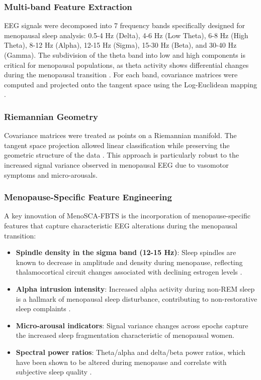 \documentclass[a4paper,fleqn]{cas-dc}
\begin{document}
\subsubsection{Multi-band Feature Extraction}
EEG signals were decomposed into 7 frequency bands specifically designed for menopausal sleep analysis: 0.5-4 Hz (Delta), 4-6 Hz (Low Theta), 6-8 Hz (High Theta), 8-12 Hz (Alpha), 12-15 Hz (Sigma), 15-30 Hz (Beta), and 30-40 Hz (Gamma). The subdivision of the theta band into low and high components is critical for menopausal populations, as theta activity shows differential changes during the menopausal transition \cite{Baker2023}. For each band, covariance matrices were computed and projected onto the tangent space using the Log-Euclidean mapping \cite{Barachant2012}.

\subsubsection{Riemannian Geometry}
Covariance matrices were treated as points on a Riemannian manifold. The tangent space projection allowed linear classification while preserving the geometric structure of the data \cite{Congedo2017}. This approach is particularly robust to the increased signal variance observed in menopausal EEG due to vasomotor symptoms and micro-arousals.

\subsubsection{Menopause-Specific Feature Engineering}
A key innovation of MenoSCA-FBTS is the incorporation of menopause-specific features that capture characteristic EEG alterations during the menopausal transition:

\begin{itemize}
\item \textbf{Spindle density in the sigma band (12-15 Hz)}: Sleep spindles are known to decrease in amplitude and density during menopause, reflecting thalamocortical circuit changes associated with declining estrogen levels \cite{Manber2003}.
\item \textbf{Alpha intrusion intensity}: Increased alpha activity during non-REM sleep is a hallmark of menopausal sleep disturbance, contributing to non-restorative sleep complaints \cite{Baker2023}.
\item \textbf{Micro-arousal indicators}: Signal variance changes across epochs capture the increased sleep fragmentation characteristic of menopausal women.
\item \textbf{Spectral power ratios}: Theta/alpha and delta/beta power ratios, which have been shown to be altered during menopause and correlate with subjective sleep quality \cite{Haufe2023}.
\end{itemize}
\end{document}
